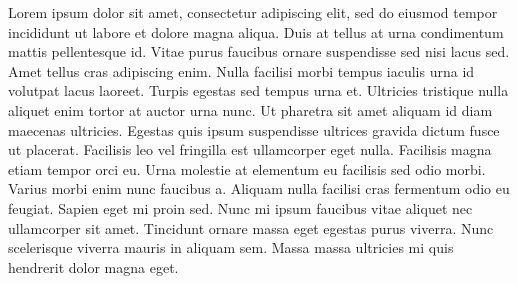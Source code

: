 \documentclass[../Thesis]{subfiles}
\begin{document}
Lorem ipsum dolor sit amet, consectetur adipiscing elit, sed do eiusmod tempor incididunt ut labore et dolore magna aliqua. Duis at tellus at urna condimentum mattis pellentesque id. Vitae purus faucibus ornare suspendisse sed nisi lacus sed. Amet tellus cras adipiscing enim. Nulla facilisi morbi tempus iaculis urna id volutpat lacus laoreet. Turpis egestas sed tempus urna et. Ultricies tristique nulla aliquet enim tortor at auctor urna nunc. Ut pharetra sit amet aliquam id diam maecenas ultricies. Egestas quis ipsum suspendisse ultrices gravida dictum fusce ut placerat. Facilisis leo vel fringilla est ullamcorper eget nulla. Facilisis magna etiam tempor orci eu. Urna molestie at elementum eu facilisis sed odio morbi. Varius morbi enim nunc faucibus a. Aliquam nulla facilisi cras fermentum odio eu feugiat. Sapien eget mi proin sed. Nunc mi ipsum faucibus vitae aliquet nec ullamcorper sit amet. Tincidunt ornare massa eget egestas purus viverra. Nunc scelerisque viverra mauris in aliquam sem. Massa massa ultricies mi quis hendrerit dolor magna eget.
\end{document}
